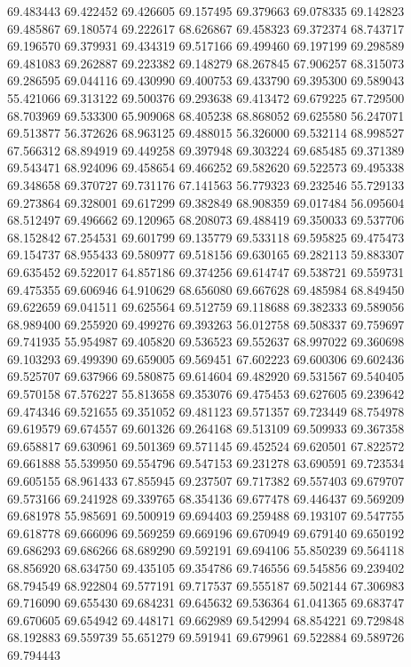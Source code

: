 69.483443
69.422452
69.426605
69.157495
69.379663
69.078335
69.142823
69.485867
69.180574
69.222617
68.626867
69.458323
69.372374
68.743717
69.196570
69.379931
69.434319
69.517166
69.499460
69.197199
69.298589
69.481083
69.262887
69.223382
69.148279
68.267845
67.906257
68.315073
69.286595
69.044116
69.430990
69.400753
69.433790
69.395300
69.589043
55.421066
69.313122
69.500376
69.293638
69.413472
69.679225
67.729500
68.703969
69.533300
65.909068
68.405238
68.868052
69.625580
56.247071
69.513877
56.372626
68.963125
69.488015
56.326000
69.532114
68.998527
67.566312
68.894919
69.449258
69.397948
69.303224
69.685485
69.371389
69.543471
68.924096
69.458654
69.466252
69.582620
69.522573
69.495338
69.348658
69.370727
69.731176
67.141563
56.779323
69.232546
55.729133
69.273864
69.328001
69.617299
69.382849
68.908359
69.017484
56.095604
68.512497
69.496662
69.120965
68.208073
69.488419
69.350033
69.537706
68.152842
67.254531
69.601799
69.135779
69.533118
69.595825
69.475473
69.154737
68.955433
69.580977
69.518156
69.630165
69.282113
59.883307
69.635452
69.522017
64.857186
69.374256
69.614747
69.538721
69.559731
69.475355
69.606946
64.910629
68.656080
69.667628
69.485984
68.849450
69.622659
69.041511
69.625564
69.512759
69.118688
69.382333
69.589056
68.989400
69.255920
69.499276
69.393263
56.012758
69.508337
69.759697
69.741935
55.954987
69.405820
69.536523
69.552637
68.997022
69.360698
69.103293
69.499390
69.659005
69.569451
67.602223
69.600306
69.602436
69.525707
69.637966
69.580875
69.614604
69.482920
69.531567
69.540405
69.570158
67.576227
55.813658
69.353076
69.475453
69.627605
69.239642
69.474346
69.521655
69.351052
69.481123
69.571357
69.723449
68.754978
69.619579
69.674557
69.601326
69.264168
69.513109
69.509933
69.367358
69.658817
69.630961
69.501369
69.571145
69.452524
69.620501
67.822572
69.661888
55.539950
69.554796
69.547153
69.231278
63.690591
69.723534
69.605155
68.961433
67.855945
69.237507
69.717382
69.557403
69.679707
69.573166
69.241928
69.339765
68.354136
69.677478
69.446437
69.569209
69.681978
55.985691
69.500919
69.694403
69.259488
69.193107
69.547755
69.618778
69.666096
69.569259
69.669196
69.670949
69.679140
69.650192
69.686293
69.686266
68.689290
69.592191
69.694106
55.850239
69.564118
68.856920
68.634750
69.435105
69.354786
69.746556
69.545856
69.239402
68.794549
68.922804
69.577191
69.717537
69.555187
69.502144
67.306983
69.716090
69.655430
69.684231
69.645632
69.536364
61.041365
69.683747
69.670605
69.654942
69.448171
69.662989
69.542994
68.854221
69.729848
68.192883
69.559739
55.651279
69.591941
69.679961
69.522884
69.589726
69.794443

